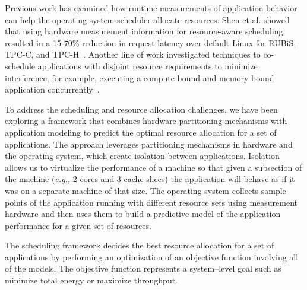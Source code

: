Previous work has examined how runtime measurements of application
behavior can help the operating system scheduler allocate resources.
Shen et al. showed that using hardware measurement information for
resource-aware scheduling resulted in a 15-70\% reduction in request
latency over default Linux for RUBiS, TPC-C, and
TPC-H~\cite{shen08counters}.  Another line of work investigated
techniques to co-schedule applications with disjoint resource
requirements to minimize interference, for example, executing a
compute-bound and memory-bound application
concurrently~\cite{thread_clustering,unc,shen08counters,hotos_perfcount}.

To address the scheduling and resource allocation challenges, we have been exploring a framework that combines hardware partitioning mechanisms with application modeling to predict the optimal resource allocation for a set of applications.  The approach leverages partitioning mechanisms in hardware and the operating system, which create isolation between applications.  Isolation allows us to virtualize the performance of a machine so that given a subsection of the machine (\emph{e.g.,} 2 cores and 3 cache slices) the application will behave as if it was on a separate machine of that size.  The operating system collects sample points of the application running with different resource sets using measurement hardware and then uses them to build a predictive model of the application performance for a given set of resources.

The scheduling framework decides the best resource allocation for a set of applications by performing an optimization of an objective function involving all of the models.  The objective function represents a system--level goal such as minimize total energy or maximize throughput.  %


